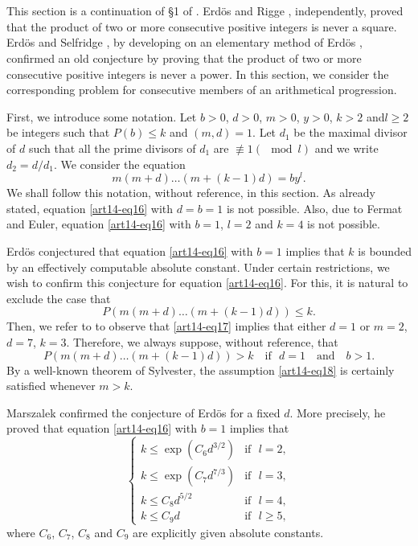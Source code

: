 \section{}\label{art14-sec3}
This section is a continuation of \S1 of \cite{art14-key27}. Erd\"os \cite{art14-key7} and Rigge \cite{art14-key21}, independently, proved that the product of two or more consecutive positive integers is never a square. Erd\"os and Selfridge \cite{art14-key9}, by developing on an elementary method of Erd\"os \cite{art14-key8}, confirmed an old conjecture by proving that the product of two or more consecutive positive integers is never a power. In this section, we consider the corresponding problem for consecutive members of an arithmetical progression.

First, we introduce some notation. Let $b>0$, $d>0$, $m>0$, $y>0$, $k>2$ and\pageoriginale $l\geq 2$ be integers such that $P(b)\leq k$ and $(m,d)=1$. Let $d_{1}$ be the maximal divisor of $d$ such that all the prime divisors of $d_{1}$ are $\nequiv 1(\mod l)$ and we write $d_{2}=d/d_{1}$. We consider the equation
\begin{equation}
m(m+d)\ldots (m+(k-1)d)=by^{l}.\label{art14-eq16}
\end{equation}
We shall follow this notation, without reference, in this section. As already stated, equation \eqref{art14-eq16} with $d=b=1$ is not possible. Also, due to Fermat and Euler, equation \eqref{art14-eq16} with $b=1$, $l=2$ and $k=4$ is not possible.

Erd\"os conjectured that equation \eqref{art14-eq16} with $b=1$ implies that $k$ is bounded by an effectively computable absolute constant. Under certain restrictions, we wish to confirm this conjecture for equation \eqref{art14-eq16}. For this, it is natural to exclude the case that
\begin{equation}
P(m(m+d)\ldots (m+(k-1)d))\leq k.\label{art14-eq17}
\end{equation}
Then, we refer to \cite{art14-key34} to observe that \eqref{art14-eq17} implies that either $d=1$ or $m=2$, $d=7$, $k=3$. Therefore, we always suppose, without reference, that
\begin{equation}
P(m(m+d)\ldots (m+(k-1)d))>k \quad\text{if~ } d=1\text{~~ and~~ } b>1.\label{art14-eq18}
\end{equation}
By a well-known theorem of Sylvester, the assumption \eqref{art14-eq18} is certainly satisfied whenever $m>k$.

Marszalek \cite{art14-key15} confirmed the conjecture of Erd\"os for a fixed $d$. More precisely, he proved that equation \eqref{art14-eq16} with $b=1$ implies that 
\begin{equation}
\begin{cases}
k\leq \exp (C_{6}d^{3/2}) & \text{if~ }l=2,\\
k\leq \exp (C_{7}d^{7/3}) & \text{if~ }l=3,\\
k\leq C_{8}d^{5/2} & \text{if~ } l=4,\\
k\leq C_{9}d & \text{if~ } l\geq 5,
\end{cases}\label{art14-eq19}
\end{equation}
where $C_{6}$, $C_{7}$, $C_{8}$ and $C_{9}$ are explicitly given absolute constants.

